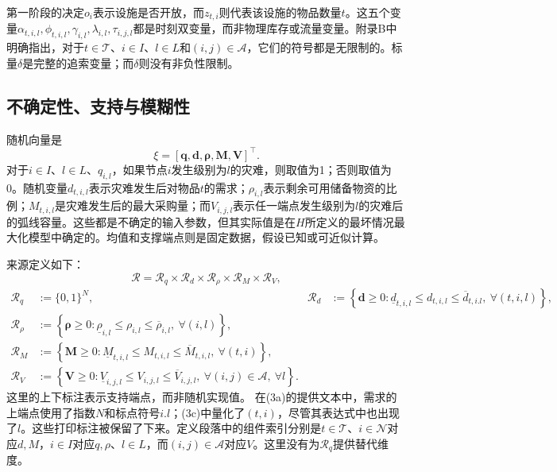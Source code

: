 \documentclass{article}
\begin{document}
第一阶段的决定$o_i$表示设施是否开放，而$z_{t,i}$则代表该设施的物品数量$t$。这五个变量$\alpha_{t,i,l},\phi_{t,i,l},\gamma_{i,l},\lambda_{i,l},\tau_{i,j,l}$都是时刻双变量，而非物理库存或流量变量。附录B中明确指出，对于$t\in\mathcal T$、$i\in I$、$l\in L$和$(i,j)\in\mathcal A$，它们的符号都是无限制的。标量$\delta$是完整的追索变量；而$\delta$则没有非负性限制。

\subsection*{不确定性、支持与模糊性}
随机向量是
\[
\xi=[\boldsymbol q,\boldsymbol d,\boldsymbol\rho,\boldsymbol M,\boldsymbol V]^\top.
\]
对于$i\in I$、$l\in L$、$q_{i,l}$，如果节点$i$发生级别为$l$的灾难，则取值为1；否则取值为0。随机变量$d_{t,i,l}$表示灾难发生后对物品$t$的需求；$\rho_{i,l}$表示剩余可用储备物资的比例；$M_{t,i,l}$是灾难发生后的最大采购量；而$V_{i,j,l}$表示任一端点发生级别为$l$的灾难后的弧线容量。这些都是不确定的输入参数，但其实际值是在$H$所定义的最坏情况最大化模型中确定的。均值和支撑端点则是固定数据，假设已知或可近似计算。

来源定义如下：
\[
\mathcal R=\mathcal R_q\times\mathcal R_d\times\mathcal R_\rho
\times\mathcal R_M\times\mathcal R_V,
\]
\begin{align}
\mathcal R_q&:=\{0,1\}^{N},&
\mathcal R_d&:=\left\{\boldsymbol d\geq0:
\underline d_{t,i,l}\leq d_{t,i,l}\leq\overline d_{t,i.l},\ \forall(t,i,l)\right\},\tag{3a}\\
\mathcal R_\rho&:=\left\{\boldsymbol\rho\geq0:
\underline\rho_{i,l}\leq\rho_{i,l}\leq\overline\rho_{i,l},\ \forall(i,l)\right\},\tag{3b}\\
\mathcal R_M&:=\left\{\boldsymbol M\geq0:
\underline M_{t,i,l}\leq M_{t,i,l}\leq\overline M_{t,i,l},\ \forall(t,i)\right\},\tag{3c}\\
\mathcal R_V&:=\left\{\boldsymbol V\geq0:
\underline V_{i,j,l}\leq V_{i,j,l}\leq\overline V_{i,j,l},\
\forall(i,j)\in\mathcal A,\ \forall l\right\}.\tag{3d}
\end{align}
这里的上下标注表示支持端点，而非随机实现值。  
在(3a)的提供文本中，需求的上端点使用了指数$N$和标点符号$i.l$；(3c)中量化了$(t,i)$，尽管其表达式中也出现了$l$。这些打印标注被保留了下来。定义段落中的组件索引分别是$t\in\mathcal T$、$i\in\mathcal N$对应$d,M$，$i\in I$对应$q,\rho$、$l\in L$，而$(i,j)\in\mathcal A$对应$V$。这里没有为$\mathcal R_q$提供替代维度。
\end{document}
